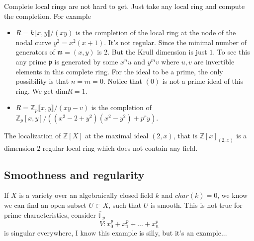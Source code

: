 \documentclass[../main.tex]{subfiles}
\begin{document}
\begin{example}

\end{example}




\begin{example}
Complete local rings are not hard to get. Just take any local ring and compute the completion. For example
\begin{itemize}
\item $R=k\llbracket x, y\rrbracket/(xy)$ is the completion of the local ring at the node of the nodal curve $y^{2}=x^{2}(x+1)$. It's not regular. Since the minimal number of generators of $\mathfrak{m}=(x,y)$ is 2. But the Krull dimension is just $1$. To see this any prime $\mathfrak{p}$ is generated by some $x^{n}u$ and $y^{m}v$ where $u, v$ are invertible elements in this complete ring.
For the ideal to be a prime, the only possibility is that $n=m=0$. Notice that $(0)$ is not a prime ideal of this ring. We get $\mathrm{dim}R=1$.
\item $R= \mathbb{Z}_p\llbracket x,y\rrbracket/(xy-v)$ is the completion of $\mathbb{Z}_p[x,y]/((x^2-2+y^2)(x^2-y^2)+p^ry)$. 
\end{itemize}
\end{example}

\begin{example}
The localization of $\mathbb{Z}[X]$ at the maximal ideal $(2,x)$, that is $\mathbb{Z}[x]_{(2,x)}$ is a dimension $2$ regular local ring which does not contain any field.
\end{example}

\subsection{Smoothness and regularity}
\begin{example}
If $X$ is a variety over an algebraically closed field $k$ and $char(k)=0$, we know we can find an open subset $U\subset X$, such that $U$ is smooth. This is not true for prime characteristics, consider $\overline{\mathbb{F}}_{p}$
$$V: x_{0}^{p}+x_{1}^{p}+\dots + x_{n}^{p}$$
is singular everywhere, I know this example is silly, but it's an example...
\end{example}
\end{document}
